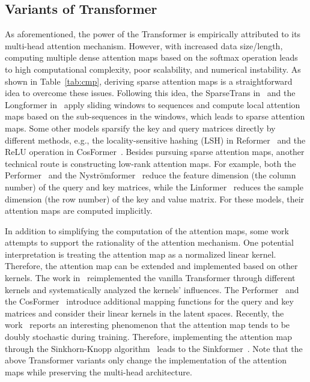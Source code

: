 \subsection{Variants of Transformer}
As aforementioned, the power of the Transformer is empirically attributed to its multi-head attention mechanism. 
However, with increased data size/length, computing multiple dense attention maps based on the softmax operation leads to high computational complexity, poor scalability, and numerical instability. 
As shown in Table~\ref{tab:cmp}, deriving sparse attention maps is a straightforward idea to overcome these issues. 
Following this idea, the SparseTrans in~\cite{child2019generating} and the Longformer in~\cite{beltagy2020longformer} apply sliding windows to sequences and compute local attention maps based on the sub-sequences in the windows, which leads to sparse attention maps.
Some other models sparsify the key and query matrices directly by different methods, e.g., the locality-sensitive hashing (LSH) in Reformer~\cite{kitaev2020reformer} and the ReLU operation in CosFormer~\cite{zhen2022cosformer}. 
Besides pursuing sparse attention maps, another technical route is constructing low-rank attention maps. 
For example, both the Performer~\cite{choromanski2021rethinking} and the Nystr{\"o}mformer~\cite{xiong2021nystromformer} reduce the feature dimension (the column number) of the query and key matrices, while the Linformer~\cite{wang2020linformer} reduces the sample dimension (the row number) of the key and value matrix. 
For these models, their attention maps are computed implicitly.

In addition to simplifying the computation of the attention maps, some work attempts to support the rationality of the attention mechanism. 
One potential interpretation is treating the attention map as a normalized linear kernel.
Therefore, the attention map can be extended and implemented based on other kernels. 
The work in~\cite{tsai2019transformer} reimplemented the vanilla Transformer through different kernels and systematically analyzed the kernels' influences.
The Performer~\cite{choromanski2021rethinking} and the CosFormer~\cite{zhen2022cosformer} introduce additional mapping functions for the query and key matrices and consider their linear kernels in the latent spaces.
Recently, the work~\cite{sander2022sinkformers} reports an interesting phenomenon that the attention map tends to be doubly stochastic during training. 
Therefore, implementing the attention map through the Sinkhorn-Knopp algorithm~\cite{sinkhorn1967concerning} leads to the Sinkformer~\cite{sander2022sinkformers}. 
Note that the above Transformer variants only change the implementation of the attention maps while preserving the multi-head architecture. 

